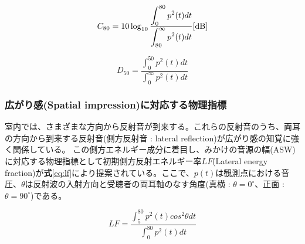 \begin{equation}
    \label{eq:c80}
  C_{80} = 10\log_{10}{\frac{\displaystyle\int_0^{80}p^2(t)dt}{\displaystyle\int_{80}^{\infty}p^2(t)dt}} \textrm{[dB]}
\end{equation}

\begin{equation}
    \label{eq:c80}
  D_{50} = {\frac{\displaystyle\int_0^{50}p^2(t)dt}{\displaystyle\int_0^{\infty}p^2(t)dt}} 
\end{equation}

\subsubsection{広がり感(Spatial impression)に対応する物理指標}
室内では、さまざまな方向から反射音が到来する。これらの反射音のうち、両耳の方向から到来する反射音(側方反射音 : lateral reflection)が広がり感の知覚に強く関係している。
この側方エネルギー成分に着目し、みかけの音源の幅(ASW)に対応する物理指標として初期側方反射エネルギー率$LF$(Lateral energy fraction)が\textbf{式}\ref{eq:lf}により提案されている。ここで、$p(t)$は観測点における音圧、$\theta$は反射波の入射方向と受聴者の両耳軸のなす角度(真横 : $\theta = 0^\circ$、正面 : $\theta = 90^\circ$)である。

\begin{equation}
    \label{eq:lf}
  LF = \frac{\displaystyle\int_5^{80}p^2(t)cos^2{\theta}dt}{\displaystyle\int_0^{80}p^2(t)dt} 
\end{equation}


\pagebreak
